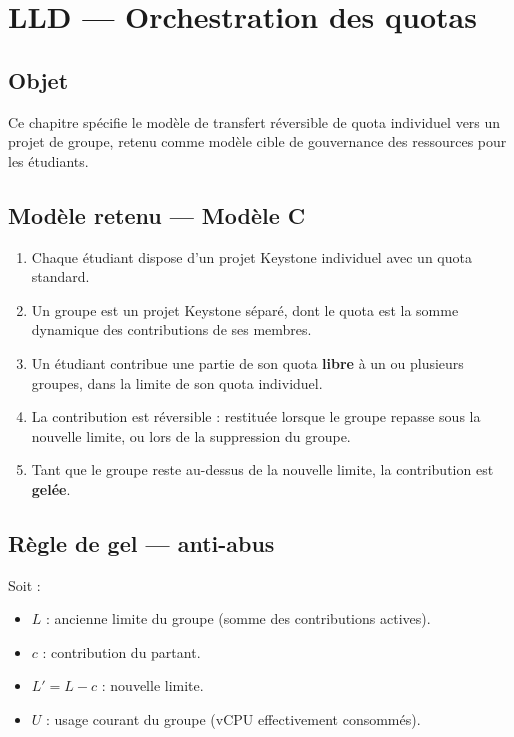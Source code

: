 \chapter{LLD — Orchestration des quotas}
\label{chap:orchestration}

\section{Objet}
Ce chapitre spécifie le modèle de transfert réversible de quota individuel vers un projet de groupe, retenu comme modèle cible de gouvernance des ressources pour les étudiants.

\section{Modèle retenu — Modèle C}
\begin{infobox}
\begin{enumerate}
  \item Chaque étudiant dispose d'un projet Keystone individuel avec un quota standard.
  \item Un groupe est un projet Keystone séparé, dont le quota est la somme dynamique des contributions de ses membres.
  \item Un étudiant contribue une partie de son quota \textbf{libre} à un ou plusieurs groupes, dans la limite de son quota individuel.
  \item La contribution est réversible : restituée lorsque le groupe repasse sous la nouvelle limite, ou lors de la suppression du groupe.
  \item Tant que le groupe reste au-dessus de la nouvelle limite, la contribution est \textbf{gelée}.
\end{enumerate}
\end{infobox}

\section{Règle de gel — anti-abus}
Soit :
\begin{itemize}
  \item $L$ : ancienne limite du groupe (somme des contributions actives).
  \item $c$ : contribution du partant.
  \item $L' = L - c$ : nouvelle limite.
  \item $U$ : usage courant du groupe (vCPU effectivement consommés).
\end{itemize}

